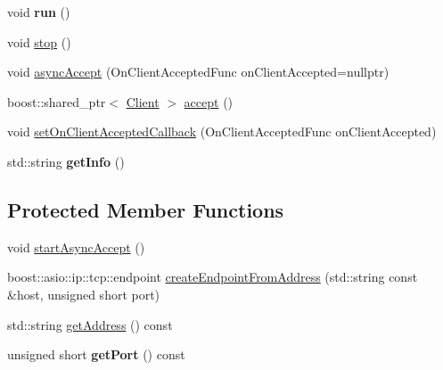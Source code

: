 \begin{DoxyCompactItemize}
void {\bfseries run} ()
\item 
void \hyperlink{classts_1_1common_1_1tcp_1_1_server_socket_a73e30878aabcc2c1f247ae868a3c1688}{stop} ()
\item 
void \hyperlink{classts_1_1common_1_1tcp_1_1_server_socket_aab226dbcb314136342551ac145c3fb92}{async\+Accept} (On\+Client\+Accepted\+Func on\+Client\+Accepted=nullptr)
\item 
boost\+::shared\+\_\+ptr$<$ \hyperlink{classts_1_1_client}{Client} $>$ \hyperlink{classts_1_1common_1_1tcp_1_1_server_socket_a08cd736bb403fddc15755c7f873ad83d}{accept} ()
\item 
void \hyperlink{classts_1_1common_1_1tcp_1_1_server_socket_a316d4bd7d6fd81ce9c1158e3619f50e3}{set\+On\+Client\+Accepted\+Callback} (On\+Client\+Accepted\+Func on\+Client\+Accepted)
\item 
\mbox{\label{classts_1_1common_1_1tcp_1_1_server_socket_a8fe85f1af4590956e3b19acda945244a}} 
std\+::string {\bfseries get\+Info} ()
\end{DoxyCompactItemize}
\subsection*{Protected Member Functions}
\begin{DoxyCompactItemize}
\item 
void \hyperlink{classts_1_1common_1_1tcp_1_1_server_socket_a22005ac2872f0afdecf2d405885f6551}{start\+Async\+Accept} ()
\item 
boost\+::asio\+::ip\+::tcp\+::endpoint \hyperlink{classts_1_1common_1_1tcp_1_1_server_socket_a7ed4e56f413a66650611e5d590453c03}{create\+Endpoint\+From\+Address} (std\+::string const \&host, unsigned short port)
\item 
std\+::string \hyperlink{classts_1_1common_1_1tcp_1_1_server_socket_a011cd2a3dcea435b354bdd61f7d6fc68}{get\+Address} () const
\item 
\mbox{\label{classts_1_1common_1_1tcp_1_1_server_socket_a30944a9a77feada3889f1499a876247f}} 
unsigned short {\bfseries get\+Port} () const
\end{DoxyCompactItemize}
